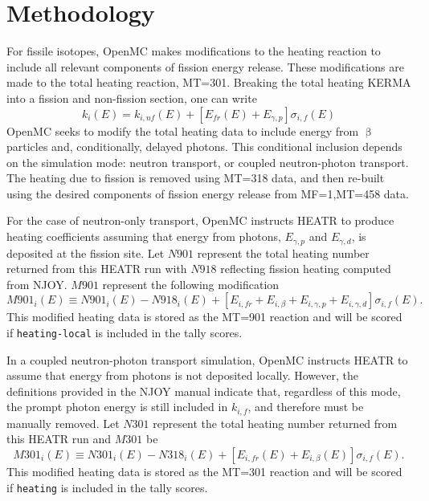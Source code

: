 \documentclass{anstrans}
\begin{document}
\section{Methodology}

For fissile isotopes, OpenMC makes modifications to the heating reaction to
include all relevant components of fission energy release. These modifications
are made to the total heating reaction, MT=301. Breaking the total heating
KERMA into a fission and non-fission section, one can write
\begin{equation}
    k_i(E) = k_{i, nf}(E) + \left[E_{fr}(E) + E_{\gamma, p}\right]\sigma_{i, f}(E)
\end{equation}
OpenMC seeks to modify the total heating data to include energy from
$\upbeta$ particles and, conditionally, delayed photons. This conditional
inclusion depends on the simulation mode: neutron transport, or coupled
neutron-photon transport. The heating due to fission is removed using MT=318
data, and then re-built using the desired components of fission energy release
from MF=1,MT=458 data.

For the case of neutron-only transport, OpenMC instructs HEATR to produce
heating coefficients assuming that energy from photons, $E_{\gamma, p}$ and
$E_{\gamma, d}$, is deposited at the fission site. Let $N901$ represent the
total heating number returned from this HEATR run with $N918$ reflecting fission
heating computed from NJOY. $M901$ represent the following modification
\begin{equation}
    M901_{i}(E)\equiv N901_{i}(E) - N918_{i}(E)
      + \left[E_{i, fr} + E_{i, \beta} + E_{i, \gamma, p}
      + E_{i, \gamma, d}\right]\sigma_{i, f}(E).
\end{equation}
This modified heating data is stored as the MT=901 reaction and will be scored
if \texttt{heating-local} is included in the tally scores.

In a coupled neutron-photon transport simulation, OpenMC instructs HEATR to
assume that energy from photons is not deposited locally. However, the
definitions provided in the NJOY manual indicate that, regardless of this mode,
the prompt photon energy is still included in $k_{i, f}$, and therefore must be
manually removed. Let $N301$ represent the total heating number returned from
this HEATR run and $M301$ be
\begin{equation}
    M301_{i}(E)\equiv N301_{i}(E) - N318_{i}(E)
      + \left[E_{i, fr}(E) + E_{i, \beta}(E)\right]\sigma_{i, f}(E).
\end{equation}
This modified heating data is stored as the MT=301 reaction and will be scored
if \texttt{heating} is included in the tally scores.
\end{document}

